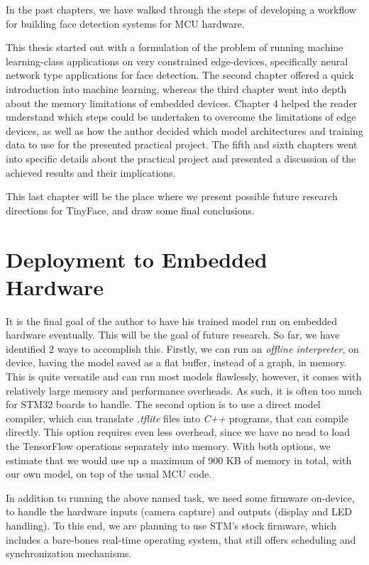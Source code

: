 In the past chapters, we have walked through the steps of developing a workflow for building face detection systems for MCU hardware. \par

This thesis started out with a formulation of the problem of running machine learning-class applications on very constrained edge-devices, specifically neural network type applications for face detection. The second chapter offered a quick introduction into machine learning, whereas the third chapter went into depth about the memory limitations of embedded devices. Chapter 4 helped the reader understand which steps could be undertaken to overcome the limitations of edge devices, as well as how the author decided which model architectures and training data to use for the presented practical project. The fifth and sixth chapters went into specific details about the practical project and presented a discussion of the achieved results and their implications. \par
This last chapter will be the place where we present possible future research directions for TinyFace, and draw some final conclusions. \par
\section{Deployment to Embedded Hardware}
It is the final goal of the author to have his trained model run on embedded hardware eventually. This will be the goal of future research. So far, we have identified 2 ways to accomplish this. Firstly, we can run an \textit{offline interpreter}, on device, having the model saved as a flat buffer, instead of a graph, in memory. This is quite versatile and can run most models flawlessly, however, it comes with relatively large memory and performance overheads. As such, it is often too much for STM32 boards to handle. The second option is to use a direct model compiler, which can translate \textit{.tflite} files into \textit{C++} programs, that can compile directly. This option requires even less overhead, since we have no nead to load the TensorFlow operations separately into memory. With both options, we estimate that we would use up a maximum of 900 KB of memory in total, with our own model, on top of the usual MCU code. \par
In addition to running the above named task, we need some firmware on-device, to handle the hardware inputs (camera capture) and outputs (display and LED handling). To this end, we are planning to use STM's stock firmware, which includes a bare-bones real-time operating system, that still offers scheduling and synchronization mechanisms.
